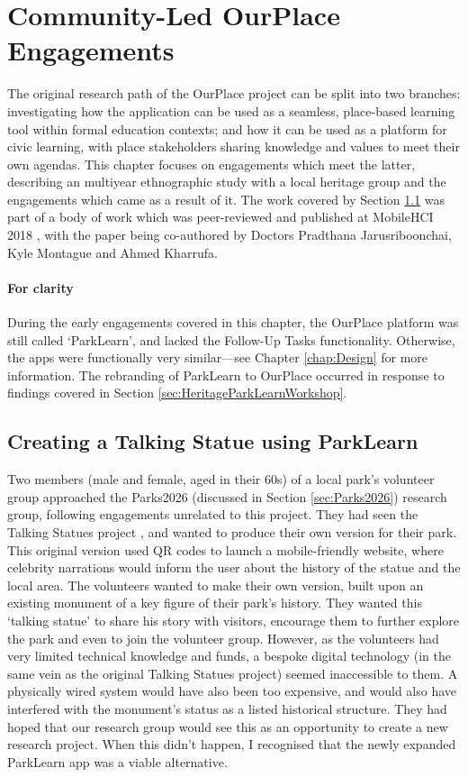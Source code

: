 \chapter{Community-Led OurPlace Engagements}
\label{chap:Community}

The original research path of the OurPlace project can be split into two branches: investigating how the application can be used as a seamless, place-based learning tool within formal education contexts; and how it can be used as a platform for civic learning, with place stakeholders sharing knowledge and values to meet their own agendas. This chapter focuses on engagements which meet the latter, describing an multiyear ethnographic study with a local heritage group and the engagements which came as a result of it. The work covered by Section \ref{sec:TalkingStatue} was part of a body of work which was peer-reviewed and published at MobileHCI 2018 \citep{Richardson2018}, with the paper being co-authored by Doctors Pradthana Jarusriboonchai, Kyle Montague and Ahmed Kharrufa.

\subsubsection{For clarity}
During the early engagements covered in this chapter, the OurPlace platform was still called `ParkLearn', and lacked the Follow-Up Tasks functionality. Otherwise, the apps were functionally very similar---see Chapter \ref{chap:Design} for more information. The rebranding of ParkLearn to OurPlace occurred in response to findings covered in Section \ref{sec:HeritageParkLearnWorkshop}.

\section{Creating a Talking Statue using ParkLearn}
\label{sec:TalkingStatue}

Two members (male and female, aged in their 60s) of a local park's volunteer group approached the Parks2026 (discussed in Section \ref{sec:Parks2026}) research group, following engagements unrelated to this project. They had seen the Talking Statues project \citep{Sing2017}, and wanted to produce their own version for their park. This original version used QR codes to launch a mobile-friendly website, where celebrity narrations would inform the user about the history of the statue and the local area. The volunteers wanted to make their own version, built upon an existing monument of a key figure of their park's history. They wanted this `talking statue' to share his story with visitors, encourage them to further explore the park and even to join the volunteer group. However, as the volunteers had very limited technical knowledge and funds, a bespoke digital technology (in the same vein as the original Talking Statues project) seemed inaccessible to them. A physically wired system would have also been too expensive, and would also have interfered with the monument’s status as a listed historical structure. They had hoped that our research group would see this as an opportunity to create a new research project. When this didn't happen, I recognised that the newly expanded ParkLearn app was a viable alternative.

